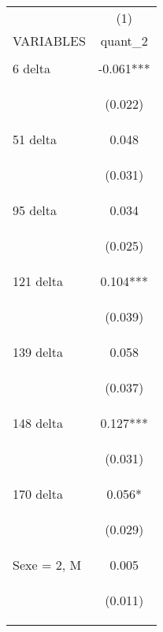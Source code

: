 \begin{center}
\begin{tabular}{lc} \hline
 & (1) \\
VARIABLES & quant\_2 \\ \hline
\vspace{4pt} & \begin{footnotesize}\end{footnotesize} \\
6 delta & -0.061*** \\
\vspace{4pt} & \begin{footnotesize}(0.022)\end{footnotesize} \\
51 delta & 0.048 \\
\vspace{4pt} & \begin{footnotesize}(0.031)\end{footnotesize} \\
95 delta & 0.034 \\
\vspace{4pt} & \begin{footnotesize}(0.025)\end{footnotesize} \\
121 delta & 0.104*** \\
\vspace{4pt} & \begin{footnotesize}(0.039)\end{footnotesize} \\
139 delta & 0.058 \\
\vspace{4pt} & \begin{footnotesize}(0.037)\end{footnotesize} \\
148 delta & 0.127*** \\
\vspace{4pt} & \begin{footnotesize}(0.031)\end{footnotesize} \\
170 delta & 0.056* \\
\vspace{4pt} & \begin{footnotesize}(0.029)\end{footnotesize} \\
Sexe = 2, M & 0.005 \\
\vspace{4pt} & \begin{footnotesize}(0.011)\end{footnotesize} \\

\end{tabular}
\end{center}
